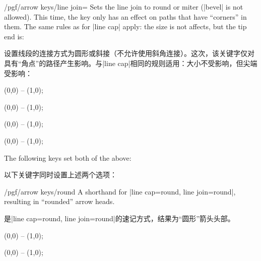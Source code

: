 \begin{key}{/pgf/arrow keys/line join=}
    Sets the line join to round or miter (|bevel| is not allowed). This time,
    the key only has an effect on paths that have ``corners'' in them. The same
    rules as for |line cap| apply: the size is not affects, but the tip end is:
    
    设置线段的连接方式为圆形或斜接（不允许使用斜角连接）。这次，该关键字仅对具有“角点”的路径产生影响。与|line cap|相同的规则适用：大小不受影响，但尖端受影响：


\begin{codeexample}[width=3cm,preamble={\usetikzlibrary{arrows.meta}}]
\tikz [line width=2mm]
  \draw [arrows = {-Computer Modern Rightarrow[line join=miter]}]
        (0,0) -- (1,0);
\end{codeexample}
\begin{codeexample}[width=3cm,preamble={\usetikzlibrary{arrows.meta}}]
\tikz [line width=2mm]
  \draw [arrows = {-Computer Modern Rightarrow[line join=round]}]
        (0,0) -- (1,0);
\end{codeexample}
\begin{codeexample}[width=3cm,preamble={\usetikzlibrary{arrows.meta}}]
\tikz [line width=2mm]
  \draw [arrows = {-Bracket[reversed,line join=miter]}]
        (0,0) -- (1,0);
\end{codeexample}
\begin{codeexample}[width=3cm,preamble={\usetikzlibrary{arrows.meta}}]
\tikz [line width=2mm]
  \draw [arrows = {-Bracket[reversed,line join=round]}]
        (0,0) -- (1,0);
\end{codeexample}
\end{key}

The following keys set both of the above:

以下关键字同时设置上述两个选项：



\begin{key}{/pgf/arrow keys/round}
    A shorthand for |line cap=round, line join=round|, resulting in ``rounded''
    arrow heads.
    
    是|line cap=round, line join=round|的速记方式，结果为“圆形”箭头头部。
\begin{codeexample}[width=3cm,preamble={\usetikzlibrary{arrows.meta}}]
\tikz [line width=2mm]
  \draw [arrows = {-Computer Modern Rightarrow[round]}] (0,0) -- (1,0);
\end{codeexample}
\begin{codeexample}[width=3cm,preamble={\usetikzlibrary{arrows.meta}}]
\tikz [line width=2mm]
  \draw [arrows = {-Bracket[reversed,round]}] (0,0) -- (1,0);
\end{codeexample}
\end{key}

